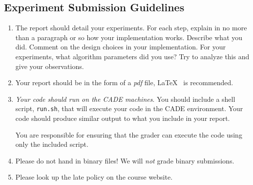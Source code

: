 \subsection*{Experiment Submission Guidelines}
\begin{enumerate}
\item The report should detail your experiments. For each step, explain in no
  more than a paragraph or so how your implementation works. Describe what you
  did. Comment on the design choices in your implementation. For your
  experiments, what algorithm parameters did you use? Try to analyze this and
  give your observations.

\item Your report should be in the form of a \emph{pdf} file, \LaTeX~
  is recommended.


\item {\em Your code should run on the CADE machines}. You should
  include a shell script, {\tt run.sh}, that will execute your code
  in the CADE environment. Your code should produce similar output
  to what you include in your report.

  You are responsible for ensuring that the grader can execute the code using
  only the included script.

\item Please do not hand in binary files! We will {\em not} grade
  binary submissions.

\item Please look up the late policy on the course website.

\end{enumerate}

